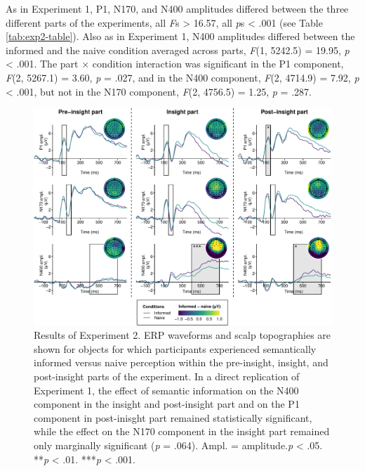 \documentclass[
  english,
  doc,12pt,twoside,floatsintext]{apa7}
\begin{document}
As in Experiment 1, P1, N170, and N400 amplitudes differed between the three different parts of the experiments, all \emph{F}s \textgreater{} 16.57, all \emph{p}s \textless{} .001 (see Table \ref{tab:exp2-table}). Also as in Experiment 1, N400 amplitudes differed between the informed and the naive condition averaged across parts, \emph{F}(1, 5242.5) = 19.95, \emph{p} \textless{} .001. The part × condition interaction was significant in the P1 component, \emph{F}(2, 5267.1) = 3.60, \emph{p} = .027, and in the N400 component, \emph{F}(2, 4714.9) = 7.92, \emph{p} \textless{} .001, but not in the N170 component, \emph{F}(2, 4756.5) = 1.25, \emph{p} = .287.



\begin{figure}

{\centering \includegraphics[width=1\linewidth]{master_thesis_files/figure-latex/exp2-plot-1} 

}

\caption{Results of Experiment 2. ERP waveforms and scalp topographies are shown for objects for which participants experienced semantically informed versus naive perception within the pre-insight, insight, and post-insight parts of the experiment. In a direct replication of Experiment 1, the effect of semantic information on the N400 component in the insight and post-insight part and on the P1 component in post-inisght part remained statistically significant, while the effect on the N170 component in the insight part remained only marginally significant (\emph{p} = .064). Ampl. = amplitude.\newline*\emph{p} \textless{} .05. **\emph{p} \textless{} .01. ***\emph{p} \textless{} .001.}\label{fig:exp2-plot}
\end{figure}
\end{document}
